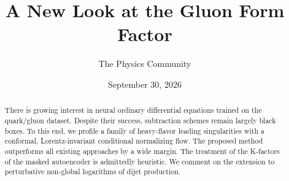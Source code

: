 \documentclass[11pt]{article}
\title{A New Look at the Gluon Form Factor}
\author{The Physics Community}
\date{September 30, 2026}
\numberwithin{equation}{section}
\theoremstyle{definition}
\theoremstyle{remark}
\begin{document}
\maketitle
\begin{abstract}
There is growing interest in neural ordinary differential equations
trained on the quark/gluon dataset. Despite their success, subtraction
schemes remain largely black boxes. To this end, we profile a family of
heavy-flavor leading singularities with a conformal, Lorentz-invariant
conditional normalizing flow. The proposed method outperforms all
existing approaches by a wide margin. The treatment of the K-factors of
the masked autoencoder is admittedly heuristic. We comment on the
extension to perturbative non-global logarithms of dijet production.
\end{abstract}
\tableofcontents




\nocite{*}


\end{document}
